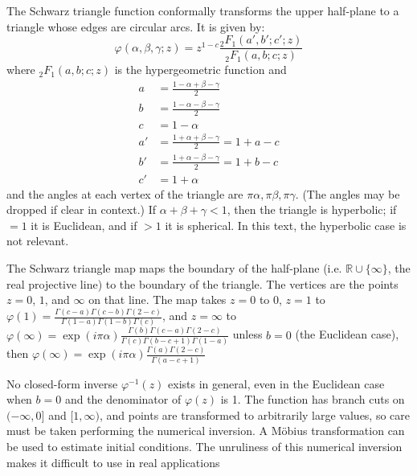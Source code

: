 \documentclass{amsart}[12pt]
\begin{document}
The Schwarz triangle function conformally transforms the upper
half-plane to a triangle whose edges are circular arcs. It is given by:
\begin{equation}
   \varphi(\alpha,\beta,\gamma; z) = z^{1-c} \frac{_2 F_1(a',b';c';z)}{_2 F_1(a,b;c;z)}
\end{equation}
where $_2 F_1(a,b;c;z)$ is the hypergeometric function and
\begin{equation}\begin{split}
   a & = \frac{1 - \alpha + \beta - \gamma}{2}\\
   b & = \frac{1 - \alpha - \beta - \gamma}{2}\\
   c & = 1 - \alpha\\
   a' &= \frac{1 + \alpha + \beta - \gamma}{2} = 1 + a - c\\
   b' &= \frac{1 + \alpha - \beta - \gamma}{2} = 1 + b - c\\
   c' &= 1 + \alpha
\end{split}\end{equation}
and the angles at each vertex of the triangle are $\pi \alpha, \pi \beta,
\pi \gamma$. (The angles may be dropped if clear in context.)
If $\alpha + \beta + \gamma < 1$, then the triangle is hyperbolic;
if $=1$ it is Euclidean, and if $>1$ it is spherical.\cite{nehari65}
In this text, the hyperbolic case is not relevant.

The Schwarz triangle map maps the boundary of the half-plane
(i.e. $\mathbb{R} \cup \{\infty\}$, the real projective line)
to the boundary of the triangle. The vertices are the points $z=0$, $1$, and
$\infty$ on that line. The map takes $z=0$ to $0$, $z=1$ to $\varphi(1) =
\frac{\Gamma(c-a) \Gamma(c-b) \Gamma(2-c)}{\Gamma(1-a) \Gamma(1-b) \Gamma(c)}$,
and $z=\infty$ to $\varphi(\infty) = \exp\left(i \pi \alpha \right)
\frac{\Gamma(b) \Gamma(c-a) \Gamma(2-c)}{\Gamma(c) \Gamma(b-c+1) \Gamma(1-a)}$
unless $b=0$ (the Euclidean case),
then $\varphi(\infty) = \exp\left(i \pi \alpha \right)
\frac{\Gamma(a) \Gamma(2-c)}{\Gamma(a-c+1)}$

No closed-form inverse $\varphi^{-1}(z)$ exists in general, even in the
Euclidean case when $b=0$ and the denominator of $\varphi(z)$ is 1.
The function has branch cuts on $(-\infty,0]$ and $[1, \infty)$,
and points are transformed to arbitrarily large values,
so care must be taken performing the numerical inversion. A M\"obius
transformation can be used to estimate initial conditions. The unruliness of this numerical inversion makes it difficult to use in real applications
\end{document}
